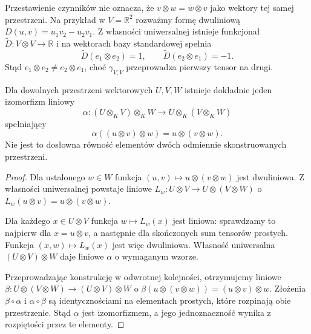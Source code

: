 Przestawienie czynników nie oznacza,
że \(v\otimes w=w\otimes v\)
jako wektory tej samej przestrzeni.
Na przykład w
\(V=\mathbb R^2\) rozważmy formę
dwuliniową
\(D(u,v)=u_1v_2-u_2v_1\).
Z własności uniwersalnej istnieje
funkcjonał
\(\widetilde D\colon V\otimes V\to\mathbb R\)
i na wektorach bazy standardowej
spełnia
\[
 \widetilde D(e_1\otimes e_2)=1,
 \qquad
 \widetilde D(e_2\otimes e_1)=-1.
\]
Stąd \(e_1\otimes e_2\ne
e_2\otimes e_1\), choć
\(\gamma_{V,V}\) przeprowadza
pierwszy tensor na drugi.

\begin{twierdzenie}
\label{thm:lin9-lacznosc}
Dla dowolnych przestrzeni
wektorowych \(U,V,W\) istnieje
dokładnie jeden izomorfizm liniowy
\[
 \alpha\colon (U\otimes_KV)\otimes_KW
 \longrightarrow U\otimes_K(V\otimes_KW)
\]
spełniający
\[
 \alpha((u\otimes v)\otimes w)
 =u\otimes(v\otimes w).
\]
Nie jest to dosłowna równość
elementów dwóch odmiennie
skonstruowanych przestrzeni.
\end{twierdzenie}
\begin{proof}
Dla ustalonego \(w\in W\)
funkcja
\((u,v)\mapsto u\otimes(v\otimes w)\)
jest dwuliniowa.
Z własności uniwersalnej
powstaje liniowe
\(L_w\colon U\otimes V\to
U\otimes(V\otimes W)\)
o
\(L_w(u\otimes v)=u\otimes(v\otimes w)\).

Dla każdego \(x\in U\otimes V\)
funkcja \(w\mapsto L_w(x)\)
jest liniowa: sprawdzamy to
najpierw dla \(x=u\otimes v\),
a następnie dla skończonych
sum tensorów prostych.
Funkcja \((x,w)\mapsto L_w(x)\)
jest więc dwuliniowa.
Własność uniwersalna
\((U\otimes V)\otimes W\)
daje liniowe \(\alpha\)
o wymaganym wzorze.

Przeprowadzając konstrukcję
w odwrotnej kolejności,
otrzymujemy liniowe
\(\beta\colon U\otimes(V\otimes W)
\to (U\otimes V)\otimes W\)
o \(\beta(u\otimes(v\otimes w))
=(u\otimes v)\otimes w\).
Złożenia \(\beta\circ\alpha\)
i \(\alpha\circ\beta\)
są identycznościami
na elementach prostych,
które rozpinają obie przestrzenie.
Stąd \(\alpha\) jest izomorfizmem,
a jego jednoznaczność wynika
z rozpiętości przez te elementy.
\end{proof}

